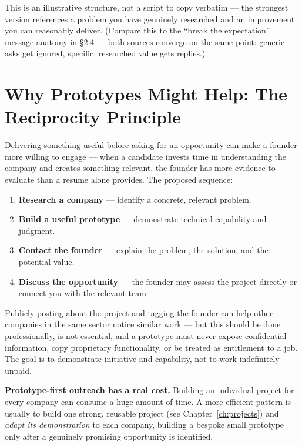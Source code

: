\begin{caution}
This is an illustrative structure, not a script to copy verbatim --- the strongest version references a problem
you have genuinely researched and an improvement you can reasonably deliver. (Compare this to the ``break the
expectation'' message anatomy in \S2.4 --- both sources converge on the same point: generic asks get ignored,
specific, researched value gets replies.)
\end{caution}

\section{Why Prototypes Might Help: The Reciprocity Principle}

Delivering something useful before asking for an opportunity can make a founder more willing to engage --- when a
candidate invests time in understanding the company and creates something relevant, the founder has more evidence
to evaluate than a resume alone provides. The proposed sequence:

\begin{enumerate}
  \item \textbf{Research a company} --- identify a concrete, relevant problem.
  \item \textbf{Build a useful prototype} --- demonstrate technical capability and judgment.
  \item \textbf{Contact the founder} --- explain the problem, the solution, and the potential value.
  \item \textbf{Discuss the opportunity} --- the founder may assess the project directly or connect you with the
  relevant team.
\end{enumerate}

Publicly posting about the project and tagging the founder can help other companies in the same sector notice
similar work --- but this should be done professionally, is not essential, and a prototype must never expose
confidential information, copy proprietary functionality, or be treated as entitlement to a job. The goal is to
demonstrate initiative and capability, not to work indefinitely unpaid.

\begin{caution}
\textbf{Prototype-first outreach has a real cost.} Building an individual project for every company can consume
a huge amount of time. A more efficient pattern is usually to build one strong, reusable project (see
Chapter~\ref{ch:projects}) and \emph{adapt its demonstration} to each company, building a bespoke small prototype
only after a genuinely promising opportunity is identified.
\end{caution}

